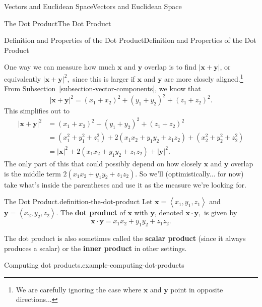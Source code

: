 \documentclass[10pt,]{book}
\newcommand{\terminology}[1]{\textbf{#1}}
\numberwithin{equation}{section}
\newcommand{\vv}[1]{\mathbf{#1}}
\newcommand{\dotprod}[1]{\left\langle #1 \right\rangle}
\begin{document}
\begin{chapterptx}{Vectors and Euclidean Space}{}{Vectors and Euclidean Space}{}{}
\begin{sectionptx}{The Dot Product}{}{The Dot Product}{}{}
\begin{subsectionptx}{Definition and Properties of the Dot Product}{}{Definition and Properties of the Dot Product}{}{}
\begin{figure}
{
}
\end{figure}
\hypertarget{p-909}{}%
One way we can measure how much \(\vv{x}\) and \(\vv{y}\) overlap is to find \(|\vv{x}+\vv{y}|\), or equivalently \(|\vv{x}+\vv{y}|^{2},\) since this is larger if \(\vv{x}\) and \(\vv{y}\) are more closely aligned.\footnote{We are carefully ignoring the case where \(\vv{x}\) and \(\vv{y}\) point in opposite directions...\label{fn-5}} From \hyperref[subsection-vector-components]{Subsection~\ref{subsection-vector-components}}, we know that%
%
\begin{equation*}
|\vv{x}+\vv{y}|^{2} = (x_{1}+x_{2})^{2} + (y_{1}+y_{2})^{2} + (z_{1}+z_{2})^{2}.
\end{equation*}
\hypertarget{p-910}{}%
This simplifies out to%
%
\begin{align*}
|\vv{x}+\vv{y}|^{2} & = (x_{1}+x_{2})^{2} + (y_{1}+y_{2})^{2} + (z_{1}+z_{2})^{2} \\
& = (x_{1}^{2}+y_{1}^{2}+z_{1}^{2}) + 2(x_{1}x_{2} + y_{1}y_{2} + z_{1}z_{2}) + (x_{2}^{2} + y_{2}^{2} + z_{2}^{2}) \\
& = |\vv{x}|^{2} + 2(x_{1}x_{2} + y_{1}y_{2} + z_{1}z_{2}) + |\vv{y}|^{2}. 
\end{align*}
\hypertarget{p-911}{}%
The only part of this that could possibly depend on how closely \(\vv{x}\) and \(\vv{y}\) overlap is the middle term \(2(x_{1}x_{2}+y_{1}y_{2}+z_{1}z_{2})\). So we'll (optimistically... for now) take what's inside the parentheses and use it as the measure we're looking for.%
\begin{definition}{The Dot Product.}{definition-the-dot-product}%
\hypertarget{p-912}{}%
Let \(\vv{x} = \dotprod{x_{1},y_{1},z_{1}}\) and \(\vv{y} = \dotprod{x_{2},y_{2},z_{2}}\). The \terminology{dot product} of \(\vv{x}\) with \(\vv{y}\), denoted \(\vv{x}\cdot\vv{y},\) is given by%
%
\begin{equation*}
\vv{x}\cdot\vv{y} = x_{1}x_{2}+y_{1}y_{2}+z_{1}z_{2}.
\end{equation*}
\end{definition}
\hypertarget{p-913}{}%
The dot product is also sometimes called the \terminology{scalar product} (since it always produces a scalar) or the \terminology{inner product} in other settings.%
\begin{example}{Computing dot products.}{example-computing-dot-products}%

\end{example}
\end{subsectionptx}
\end{sectionptx}
\end{chapterptx}
\end{document}
